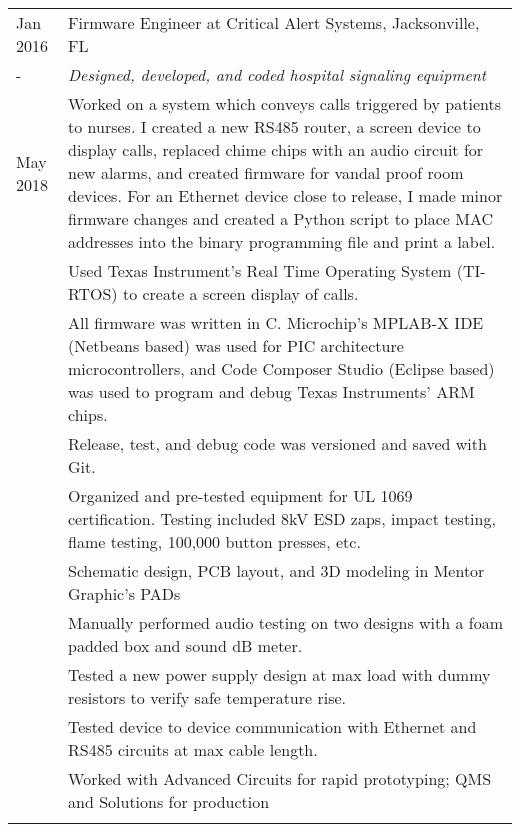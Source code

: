 \documentclass[a4paper,10pt]{article} %
\begin{document}
\begin{tabular}{p{1.6cm}|p{12.4cm}}


\centering Jan 2016 &  Firmware Engineer at Critical Alert Systems, Jacksonville, FL \\
\centering - & \emph{Designed, developed, and coded hospital signaling equipment}\\
\centering May 2018 & \footnotesize{Worked on a system which conveys calls triggered by patients to nurses. I created a new RS485 router, a screen device to display calls, replaced chime chips with an audio circuit for new alarms, and created firmware for vandal proof room devices.
For an Ethernet device close to release, I made minor firmware changes and created a Python script to place MAC addresses into the binary programming file and print a label.}\\
&\footnotesize{Used Texas Instrument's Real Time Operating System (TI-RTOS) to create a screen display of calls.}\\
&\footnotesize{All firmware was written in C. Microchip's MPLAB-X IDE (Netbeans based) was used for PIC architecture microcontrollers, and Code Composer Studio (Eclipse based) was used to program and debug Texas Instruments' ARM chips.}\\
&\footnotesize{Release, test, and debug code was versioned and saved with Git.}\\
&\footnotesize{Organized and pre-tested equipment for UL 1069 certification. Testing included 8kV ESD zaps, impact testing, flame testing, 100,000 button presses, etc.}\\
&\footnotesize{Schematic design, PCB layout, and 3D modeling in Mentor Graphic's PADs}\\
&\footnotesize{Manually performed audio testing on two designs with a foam padded box and sound dB meter.}\\
&\footnotesize{Tested a new power supply design at max load with dummy resistors to verify safe temperature rise.}\\
&\footnotesize{Tested device to device communication with Ethernet and RS485 circuits at max cable length.}\\
&\footnotesize{Worked with Advanced Circuits for rapid prototyping; QMS and Solutions for production}\\
\multicolumn{2}{c}{} \\


\end{tabular}
\end{document}

